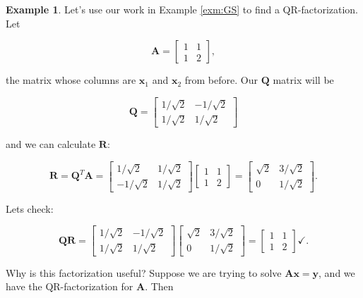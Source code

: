 \documentclass[
]{book}
\theoremstyle{definition}
\theoremstyle{definition}
\newtheorem{example}{Example}[chapter]
\theoremstyle{definition}
\theoremstyle{definition}
\theoremstyle{remark}
\begin{document}
\begin{examplebox}

\begin{example}
Let's use our work in Example \ref{exm:GS} to find a QR-factorization. Let

\[\mathbf{A}=\begin{bmatrix}1 & 1\\1 & 2\end{bmatrix},\]

the matrix whose columns are \(\mathbf{x}_1\) and \(\mathbf{x}_2\) from before. Our \(\mathbf{Q}\) matrix will be

\[\mathbf{Q}=\begin{bmatrix}1/\sqrt{2}&-1/\sqrt{2}\\1/\sqrt{2} & 1/\sqrt{2}\end{bmatrix}\]

and we can calculate \(\mathbf{R}:\)

\[\mathbf{R}=\mathbf{Q}^T\mathbf{A}=\begin{bmatrix}1/\sqrt{2} &1/\sqrt{2}\\-1/\sqrt{2} & 1/\sqrt{2}\end{bmatrix}\begin{bmatrix}1 & 1\\1 & 2\end{bmatrix}=\begin{bmatrix}\sqrt{2} & 3/\sqrt{2}\\0 & 1/\sqrt{2}\end{bmatrix}.\]

Lets check:

\[\mathbf{Q}\mathbf{R}=\begin{bmatrix}1/\sqrt{2}&-1/\sqrt{2}\\1/\sqrt{2} & 1/\sqrt{2}\end{bmatrix}\begin{bmatrix}\sqrt{2} & 3/\sqrt{2}\\0 & 1/\sqrt{2}\end{bmatrix}=\begin{bmatrix}1 & 1\\1 & 2\end{bmatrix}\checkmark.\]
\end{example}

\end{examplebox}

Why is this factorization useful? Suppose we are trying to solve \(\mathbf{A}\mathbf{x}=\mathbf{y}\), and we have the QR-factorization for \(\mathbf{A}\). Then
\end{document}
